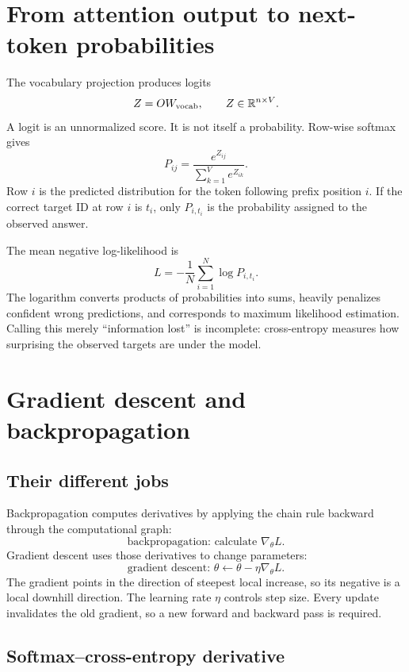 \documentclass[11pt]{article}
\newcommand{\R}{\mathbb{R}}
\newcommand{\grad}{\nabla}
\begin{document}
\section{From attention output to next-token probabilities}

The vocabulary projection produces logits
\[
  Z=OW_{\rm vocab},\qquad Z\in\R^{n\times V}.
\]
A logit is an unnormalized score. It is not itself a probability. Row-wise softmax gives
\[
  P_{ij}=\frac{e^{Z_{ij}}}{\sum_{k=1}^{V}e^{Z_{ik}}}.
\]
Row $i$ is the predicted distribution for the token following prefix position $i$. If the correct target ID
at row $i$ is $t_i$, only $P_{i,t_i}$ is the probability assigned to the observed answer.

The mean negative log-likelihood is
\begin{equation}
  L=-\frac1N\sum_{i=1}^N\log P_{i,t_i}.
  \label{eq:loss}
\end{equation}
The logarithm converts products of probabilities into sums, heavily penalizes confident wrong predictions,
and corresponds to maximum likelihood estimation. Calling this merely ``information lost'' is incomplete:
cross-entropy measures how surprising the observed targets are under the model.

\section{Gradient descent and backpropagation}

\subsection{Their different jobs}

Backpropagation computes derivatives by applying the chain rule backward through the computational graph:
\[
  \text{backpropagation: calculate }\grad_\theta L.
\]
Gradient descent uses those derivatives to change parameters:
\[
  \text{gradient descent: }\theta\leftarrow\theta-\eta\grad_\theta L.
\]
The gradient points in the direction of steepest local increase, so its negative is a local downhill direction.
The learning rate $\eta$ controls step size. Every update invalidates the old gradient, so a new forward and
backward pass is required.

\subsection{Softmax--cross-entropy derivative}
\end{document}
